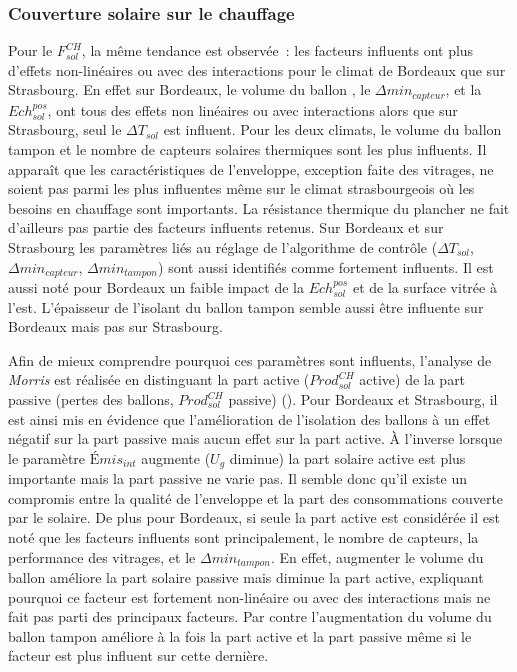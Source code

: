 \subsubsection{Couverture solaire sur le chauffage} %
\label{ssub:couverture_solaire_sur_le_chauffage}
Pour le $F_{sol}^{CH}$, la même tendance est observée~: les facteurs influents ont plus
d’effets non-linéaires ou avec des interactions pour le climat de Bordeaux que sur
Strasbourg. En effet sur Bordeaux, le volume du ballon , le $\Delta
min_{capteur}$, et la $Ech_{sol}^{pos}$, ont tous des effets non linéaires ou avec
interactions alors que sur Strasbourg, seul le $\Delta T_{sol}$ est influent. Pour les
deux climats, le volume du ballon tampon et le nombre de capteurs solaires thermiques sont
les plus influents. Il apparaît que les caractéristiques de l’enveloppe, exception faite
des vitrages, ne soient pas parmi les plus influentes même sur le climat strasbourgeois où
les besoins en chauffage sont importants. La résistance thermique du plancher ne fait d’ailleurs
pas partie des facteurs influents retenus.
Sur Bordeaux et sur Strasbourg les
paramètres liés au réglage de l’algorithme de contrôle ($\Delta T_{sol}$, $\Delta
min_{capteur}$, $\Delta min_{tampon}$) sont aussi identifiés comme fortement influents. Il
est aussi noté pour Bordeaux un faible impact de la $Ech_{sol}^{pos}$ et de la surface
vitrée à l’est. L’épaisseur de l’isolant du ballon tampon semble aussi être influente sur
Bordeaux mais pas sur Strasbourg.

Afin de mieux comprendre pourquoi ces paramètres sont influents, l’analyse de
\textit{Morris} est réalisée en distinguant la part active ($Prod_{sol}^{CH}$ active) de
la part passive (pertes des ballons, $Prod_{sol}^{CH}$ passive) ().
Pour Bordeaux et Strasbourg, il est ainsi mis en
évidence que l’amélioration de l’isolation des ballons à un effet négatif sur la part
passive mais aucun effet sur la part active. À l’inverse lorsque le paramètre
$Émis_{int}$ augmente ($U_{g}$ diminue) la part solaire active est plus importante mais la
part passive ne varie pas. Il semble donc qu’il existe un compromis entre la qualité de
l’enveloppe et la part des consommations couverte par le solaire. De plus pour Bordeaux,
si seule la part active est considérée il est noté que les facteurs influents sont
principalement, le nombre de capteurs, la performance des vitrages, et le $\Delta
min_{tampon}$. En effet, augmenter le volume du ballon  améliore la part solaire
passive mais diminue la part active, expliquant pourquoi ce facteur est fortement
non-linéaire ou avec des interactions mais ne fait pas parti des principaux facteurs. Par
contre l’augmentation du volume du ballon tampon améliore à la fois la part active et la
part passive même si le facteur est plus influent sur cette dernière.

